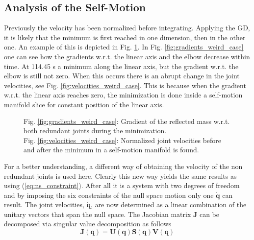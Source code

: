 \subsection{Analysis of the Self-Motion}





Previously the velocity has been normalized before integrating. Applying the GD, it is likely that the minimum is first reached in one dimension, then in the other one. An example of this is depicted in Fig. \ref{fig:weird case}. In  Fig. \ref{fig:gradients_weird_case} one can see how the gradients w.r.t. the linear axis %
and the elbow %
decrease within time. At 114.45 s a minimum along the linear axis, but the gradient w.r.t. the elbow is still not zero. When this occurs there is an abrupt change in the joint velocities, see Fig. \ref{fig:velocities_weird_case}.
This is because when the gradient w.r.t. the linear axis %
reaches zero, the minimization is done inside a self-motion manifold slice for constant position of the linear axis.

\begin{figure}[!htb]
	\centering	
	 	 	 	
	\caption{Fig. \ref{fig:gradients_weird_case}: Gradient of the reflected mass w.r.t. both redundant joints during the minimization. \\ Fig.  \ref{fig:velocities_weird_case}: Normalized joint velocities before and after the minimum in a self-motion manifold is found. }
	\label{fig:weird case}
\end{figure} 






For a better understanding, a different way of obtaining the velocity of the non redundant joints is used here. Clearly this new way yields the same results as using  (\ref{eq:ns_constraint}). After all it is a system with two degrees of freedom and by imposing the six constraints of the null space motion only one $\mathbf{\dot{q}}$ can result.
The joint velocities, $\dot{\mathbf{q}}$, are now determined as a linear combination of the unitary vectors that span the null space.
The Jacobian matrix $\mathbf{J}$ can be decomposed via singular value decomposition \cite{svd} as follows
\begin{equation}
\mathbf{J}(\mathbf{q})=\mathbf{U}(\mathbf{q}) \mathbf{S}(\mathbf{q}) \mathbf{V}(\mathbf{q})
\label{eq:svd}
\end{equation}

